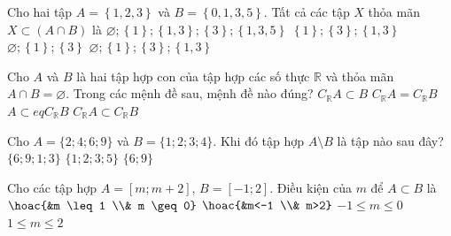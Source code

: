 \begin{ex}%
	Cho hai tập $A =  \left\{1, 2, 3\right\}$ và $B = \left\{0, 1, 3, 5\right\}$. Tất cả các tập $X$ thỏa mãn $X \subset \left(A \cap B \right)$ là
	\choice 
		{$\varnothing; \left\{1\right\}; \left\{1, 3\right\};  \left\{3\right\}; \left\{1, 3, 5\right\}$}
		 {$\left\{1\right\}; \left\{3\right\}; \left\{1, 3\right\}$}
		{$\varnothing; \left\{1\right\}; \left\{3\right\}$} 
		 {\True $\varnothing; \left\{1\right\}; \left\{3\right\}; \left\{1, 3\right\}$}
\end{ex}

\begin{ex}%
	Cho $A$ và $B$ là hai tập hợp con của tập hợp các số thực $\mathbb{R}$ và thỏa mãn  $A\cap B=\varnothing$. Trong các mệnh đề sau, mệnh đề nào đúng?
	 \choice
		{$C_\mathbb{R}A\subset B$} 
		{$C_\mathbb{R}A=C_\mathbb{R}B$} 
		{\True  $A\subset eq C_\mathbb{R}B$}
		 {$C_\mathbb{R}A\subset C_\mathbb{R}B$}
\end{ex}

\begin{ex}%
	Cho  $A= \lbrace 2;4;6;9 \rbrace$ và $B= \lbrace 1;2;3;4 \rbrace$. Khi đó tập hợp $A \setminus B$ là tập nào sau đây?
	 \choice{$\varnothing $}
		{$ \lbrace 6;9;1;3  \rbrace $}
		{$\lbrace 1;2;3;5  \rbrace $}
		{\True $\lbrace  6;9 \rbrace $}
\end{ex}

\begin{ex}%
	Cho các tập hợp $A=[m;m+2]$, $B=[-1;2]$.  Điều kiện của $m$ để $A \subset B$ là
	 \choice
		{$\hoac{&m \leq 1 \\& m  \geq 0}$}
		{$\hoac{&m<-1 \\& m>2}$} 
		{\True $-1 \leq  m \leq 0$}
		 {$1 \leq m \leq 2$}
\end{ex}

